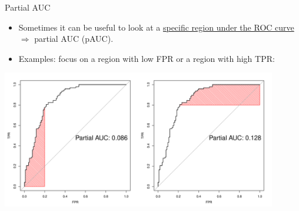 \documentclass[11pt,compress,t,notes=noshow, xcolor=table]{beamer}
\newenvironment{knitrout}{}{} %
\begin{document}
\begin{vbframe}{Partial AUC}
\begin{itemize}
  \item Sometimes it can be useful to look at a \href{http://journals.sagepub.com/doi/pdf/10.1177/0272989X8900900307}{specific region under the ROC curve}  $\Rightarrow$ partial AUC (pAUC).
  \item Examples: focus on a region with low FPR or a region with high TPR:
\end{itemize}

\begin{knitrout}\scriptsize
{}\color{fgcolor}

{\centering \includegraphics[width=0.9\textwidth]{figure/eval_mclass_roc_sp_13} 

}



\end{knitrout}

\end{vbframe}




\endlecture
\end{document}
